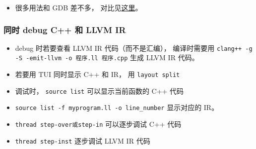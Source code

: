 
\begin{issues}
\issueDraft
\end{issues}


\begin{itemize}
\item 很多用法和 GDB 差不多， 对比见\href{https://lldb.llvm.org/use/map.html}{这里}。
\end{itemize}

\subsubsection{同时 debug C++ 和 LLVM IR}
\begin{itemize}
\item debug 时若要查看 LLVM IR 代码（而不是汇编）， 编译时需要用 \verb|clang++ -g -S -emit-llvm -o 程序.ll 程序.cpp| 生成 LLVM IR 代码。
\item 若要用 TUI 同时显示 C++ 和 IR， 用 \verb|layout split|
\item 调试时， \verb|source list| 可以显示当前函数的 C++ 代码
\item \verb|source list -f myprogram.ll -o line_number| 显示对应的 IR。
\item \verb|thread step-over或step-in| 可以逐步调试 C++ 代码
\item \verb|thread step-inst| 逐步调试 LLVM IR 代码
\end{itemize}
